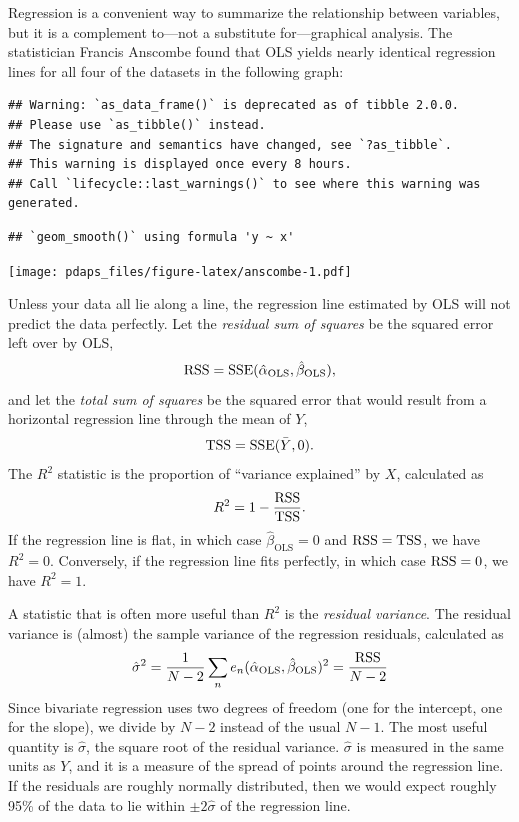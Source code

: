 \documentclass[
  12pt,
  oneside,openany]{book}
\begin{document}
Regression is a convenient way to summarize the relationship between variables, but it is a complement to---not a substitute for---graphical analysis. The statistician Francis Anscombe found that OLS yields nearly identical regression lines for all four of the datasets in the following graph:

\begin{verbatim}
## Warning: `as_data_frame()` is deprecated as of tibble 2.0.0.
## Please use `as_tibble()` instead.
## The signature and semantics have changed, see `?as_tibble`.
## This warning is displayed once every 8 hours.
## Call `lifecycle::last_warnings()` to see where this warning was generated.
\end{verbatim}

\begin{verbatim}
## `geom_smooth()` using formula 'y ~ x'
\end{verbatim}

\texttt{[image: pdaps\_files/figure-latex/anscombe-1.pdf]}

Unless your data all lie along a line, the regression line estimated by OLS will not predict the data perfectly. Let the \emph{residual sum of squares} be the squared error left over by OLS,
\[
\mathop{\rm RSS}\nolimits= \mathop{\rm SSE}\nolimits(\hat{\alpha}_{\text{OLS}}, \hat{\beta}_{\text{OLS}}),
\]
and let the \emph{total sum of squares} be the squared error that would result from a horizontal regression line through the mean of \(Y\),
\[
\mathop{\rm TSS}\nolimits= \mathop{\rm SSE}\nolimits(\bar{Y}, 0).
\]
The \(R^2\) statistic is the proportion of ``variance explained'' by \(X\), calculated as
\[
R^2 = 1 - \frac{\mathop{\rm RSS}\nolimits}{\mathop{\rm TSS}\nolimits}.
\]
If the regression line is flat, in which case \(\hat{\beta}_{\text{OLS}} = 0\) and \(\mathop{\rm RSS}\nolimits= \mathop{\rm TSS}\nolimits\), we have \(R^2= 0\). Conversely, if the regression line fits perfectly, in which case \(\mathop{\rm RSS}\nolimits= 0\), we have \(R^2 = 1\).

A statistic that is often more useful than \(R^2\) is the \emph{residual variance}. The residual variance is (almost) the sample variance of the regression residuals, calculated as
\[
\hat{\sigma}^2
= \frac{1}{N - 2} \sum_n e_n(\hat{\alpha}_{\text{OLS}}, \hat{\beta}_{\text{OLS}})^2
= \frac{\mathop{\rm RSS}\nolimits}{N - 2}
\]
Since bivariate regression uses two degrees of freedom (one for the intercept, one for the slope), we divide by \(N - 2\) instead of the usual \(N - 1\). The most useful quantity is \(\hat{\sigma}\), the square root of the residual variance. \(\hat{\sigma}\) is measured in the same units as \(Y\), and it is a measure of the spread of points around the regression line. If the residuals are roughly normally distributed, then we would expect roughly 95\% of the data to lie within \(\pm 2 \hat{\sigma}\) of the regression line.
\end{document}
